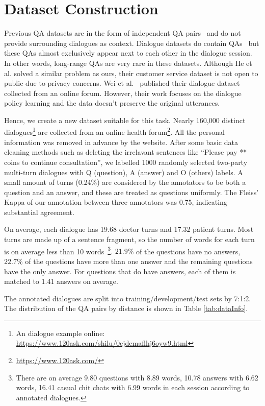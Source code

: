 \section{Dataset Construction}
\label{sec:data}
Previous QA datasets are in the form of independent QA pairs~\cite{yang2015wikiqa} and do not
provide surrounding dialogues as context.
Dialogue datasets do contain QAs~\cite{lowe2015ubuntu} but these QAs almost exclusively
appear next to each other in the dialogue session. In other words, long-range
QAs are very rare in these datasets. 
Although He et al. solved a similar problem as ours, their customer
service dataset is not open to public due to privacy 
concerns. Wei et al.~ 
published their dialogue dataset collected from an online forum. 
However, their work focuses on the dialogue policy learning and 
the data doesn't preserve the original utterances.

Hence, we create a new dataset suitable for this task. 
Nearly 160,000 distinct dialogues\footnote{An dialogue example online: 
\url{https://www.120ask.com/shilu/0cjdemaflhj6oyw9.html}} are collected from 
an online health forum\footnote{\url{https://www.120ask.com/}}. 
All the personal information was removed in advance by the website. 
After some basic data cleaning methods such as deleting the irrelavant 
sentences like ``Please pay ** coins to continue consultation'', 
we labelled 1000 randomly selected two-party multi-turn dialogues with 
Q (question), A (answer) and O (others) labels. 
A small amount of turns (0.24\%) are considered by the annotators 
to be both a question and an answer, and these are treated as questions
uniformly. The Fleiss' Kappa of our annotation between three annotators 
was 0.75, indicating substantial agreement.

On average, each dialogue has 19.68 doctor turns and 17.32 patient turns. 
Most turns are made up of a sentence fragment, so the number of words 
for each turn is on average less than 10 
words~\footnote{There are on average 9.80 questions with 8.89 words, 
10.78 answers with 6.62 words, 16.41 casual chit chats with 6.99 words 
in each session according to annotated dialogues.}. 
$21.9\%$ of the questions have no answers, $22.7\%$ of the questions 
have more than one answer and the remaining questions have the only answer. 
For questions that do have answers, each of them is matched to 1.41 answers 
on average.


The annotated dialogues are split into training/development/test sets by 7:1:2. 
The distribution of the QA pairs by distance is shown in Table \ref{tab:dataInfo}.

